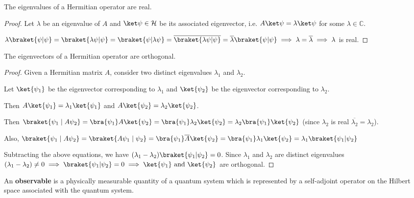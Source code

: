 \begin{prop}
    The eigenvalues of a Hermitian operator are real.
\end{prop}
\begin{proof}
    Let $\lambda$ be an eigenvalue of $A$ and $\ket\psi \in \mathcal{H}$ be its associated eigenvector, i.e. $A \ket\psi = \lambda \ket\psi$ for some $\lambda \in \mathbb{C}$.

    $\lambda\braket{\psi|\psi} = \braket{\lambda \psi|\psi} = \braket{\psi|\lambda \psi} = \overline{\braket{\lambda \psi | \psi}} = \overline{\lambda} \braket{\psi|\psi} \implies \lambda = \overline{\lambda} \implies \lambda $ is real.

\end{proof}

\begin{prop}
    The eigenvectors of a Hermitian operator are orthogonal.
\end{prop}
\begin{proof}
    Given a Hermitian matrix $A$, consider two distinct eigenvalues $\lambda_1$ and $\lambda_2$.

    Let $\ket{\psi_1}$ be the eigenvector corresponding to $\lambda_1$ and $\ket{\psi_2}$ be the eigenvector corresponding to $\lambda_2$.

    Then $A \ket{\psi_1} = \lambda_1 \ket{\psi_1}$ and  $A \ket{\psi_2} = \lambda_2 \ket{\psi_2}$.

    Then $\braket{\psi_1 \; | \; A \psi_2} = \bra{\psi_1} A \ket{ \psi_2} = \bra{\psi_1} \lambda_2 \ket{\psi_2} = \lambda_2 \bra{\psi_1} \ket{\psi_2}$ (since $\lambda_2$ is real $\overline{\lambda_2} = \lambda_2$).
    
    Also, $\braket{\psi_1 \; | \; A \psi_2} = \braket{A \psi_1 \; | \; \psi_2} = \bra{\psi_1} \overline{A} \ket{\psi_2} = \bra{\psi_1} \lambda_1 \ket{\psi_2} = \lambda_1 \braket{\psi_1|\psi_2}$
    

    Subtracting the above equations, we have $(\lambda_1 - \lambda_2) \braket{\psi_1|\psi_2} = 0$.
    Since $\lambda_1$ and $\lambda_2$ are distinct eigenvalues $(\lambda_1 - \lambda_2) \neq 0 \implies \braket{\psi_1|\psi_2} = 0 \implies \ket{\psi_1} \text{ and } \ket{\psi_2} $ are orthogonal.

\end{proof}

\begin{defn}
    An \textbf{observable} is a physically measurable quantity of a quantum system which is represented by a self-adjoint operator on the Hilbert space associated with the quantum system.
\end{defn}

